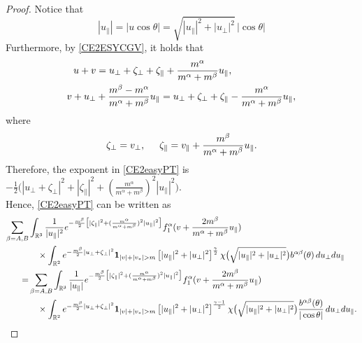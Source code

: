 \documentclass[reqno]{amsart}
\numberwithin{equation}{section}
\numberwithin{equation}{section}
\begin{document}
\begin{proof}
		Notice that 
		\begin{equation*}
			|u_{\parallel}| = |u \cos \theta| = \sqrt{|u_{\parallel}|^2 + |u_{\perp}|^2} \, |\cos \theta|
		\end{equation*}
		Furthermore, by \eqref{CE2ESYCGV}, it holds that
		\begin{align}
			u + v &= u_{\perp} + \zeta_{\perp} + \zeta_{\parallel} + \frac{m^\alpha}{m^\alpha+m^\beta}u_{\parallel}, \label{CEPT2ACA1vb}\\
			v + u_{\perp}&+\frac{m^{\beta}-m^{\alpha}}{m^{\alpha}+m^{\beta}}u_{\parallel} = u_{\perp} + \zeta_{\perp} + \zeta_{\parallel} - \frac{m^\alpha}{m^\alpha+m^\beta}u_{\parallel},\notag
		\end{align}
		where
		\begin{equation}\label{zetperzetpara}
			 \zeta_{\perp}=v_{\perp},\hspace{0.5cm}\zeta_{\parallel}=v_{\parallel}+\frac{m^\beta}{m^\alpha+m^\beta}u_{\parallel}.
		\end{equation}
		Therefore, the exponent in \eqref{CE2easyPT} is $-\frac{1}{2}\Big(|u_{\perp} + \zeta_{\perp}|^2+|\zeta_{\parallel}|^2+(\frac{m^\alpha}{m^\alpha+m^\beta})^2|u_{\parallel}|^2\Big)$.	\\
		Hence, \eqref{CE2easyPT} can be written as
		\begin{align}
			\sum_{\beta=A,B}& \int_{\mathbb{R}^3} \frac{1}{|u_{\parallel}|^2} e^{-\frac{m^\beta}{2}\big[|\zeta_{\parallel}|^2+(\frac{m^\alpha}{m^\alpha+m^\beta})^2|u_{\parallel}|^2\big]} f^\alpha_1(v + \frac{2m^{\beta}}{m^{\alpha}+m^{\beta}}u_{\parallel}) \notag\\
			&\quad \times \int_{\mathbb{R}^2} e^{-\frac{m^\beta}{2}|u_{\perp} + \zeta_{\perp}|^2} \mathbf{1}_{|v|+|v_*|>m}\left[|u_{\parallel}|^2 + |u_{\perp}|^2\right]^{\frac{\gamma}{2}} \chi\big(\sqrt{|u_{\parallel}|^2 + |u_{\perp}|^2}\big) b^{ \alpha \beta}(\theta) \, du_{\perp} du_{\parallel} \notag\\
			=&\sum_{\beta=A,B} \int_{\mathbb{R}^3} \frac{1}{|u_{\parallel}|} e^{-\frac{m^\beta}{2}\big[|\zeta_{\parallel}|^2+(\frac{m^\alpha}{m^\alpha+m^\beta})^2|u_{\parallel}|^2\big]} f^\alpha_1(v + \frac{2m^{\beta}}{m^{\alpha}+m^{\beta}}u_{\parallel})\notag \\
			&\quad \times \int_{\mathbb{R}^2} e^{-\frac{m^\beta}{2}|u_{\perp} + \zeta_{\perp}|^2} \mathbf{1}_{|v|+|v_*|>m}\left[|u_{\parallel}|^2 + |u_{\perp}|^2\right]^{\frac{\gamma - 1}{2}} \chi\big(\sqrt{|u_{\parallel}|^2 + |u_{\perp}|^2}\big) \frac{b^{ \alpha \beta}(\theta)}{|\cos \theta|} \, du_{\perp} du_{\parallel}\label{CE2BD221fSesD1}.

\end{align}
\end{proof}
\end{document}
